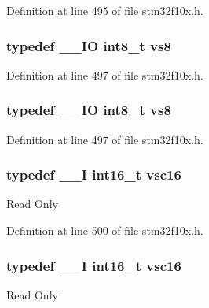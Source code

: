 Definition at line 495 of file stm32f10x.\+h.

\subsubsection[{\texorpdfstring{vs8}{vs8}}]{\setlength{\rightskip}{0pt plus 5cm}typedef {\bf \+\_\+\+\_\+\+IO} {\bf int8\+\_\+t} {\bf vs8}}\hypertarget{group___exported__types_ga9e5a203f00d2906af9466f68b4e72277}{}\label{group___exported__types_ga9e5a203f00d2906af9466f68b4e72277}


Definition at line 497 of file stm32f10x.\+h.

\subsubsection[{\texorpdfstring{vs8}{vs8}}]{\setlength{\rightskip}{0pt plus 5cm}typedef {\bf \+\_\+\+\_\+\+IO} {\bf int8\+\_\+t} {\bf vs8}}\hypertarget{group___exported__types_ga9e5a203f00d2906af9466f68b4e72277}{}\label{group___exported__types_ga9e5a203f00d2906af9466f68b4e72277}


Definition at line 497 of file stm32f10x.\+h.

\subsubsection[{\texorpdfstring{vsc16}{vsc16}}]{\setlength{\rightskip}{0pt plus 5cm}typedef {\bf \+\_\+\+\_\+I} {\bf int16\+\_\+t} {\bf vsc16}}\hypertarget{group___exported__types_ga369ae0177b957e5afa7c1e62312f97c3}{}\label{group___exported__types_ga369ae0177b957e5afa7c1e62312f97c3}
Read Only 

Definition at line 500 of file stm32f10x.\+h.

\subsubsection[{\texorpdfstring{vsc16}{vsc16}}]{\setlength{\rightskip}{0pt plus 5cm}typedef {\bf \+\_\+\+\_\+I} {\bf int16\+\_\+t} {\bf vsc16}}\hypertarget{group___exported__types_ga369ae0177b957e5afa7c1e62312f97c3}{}\label{group___exported__types_ga369ae0177b957e5afa7c1e62312f97c3}
Read Only 

